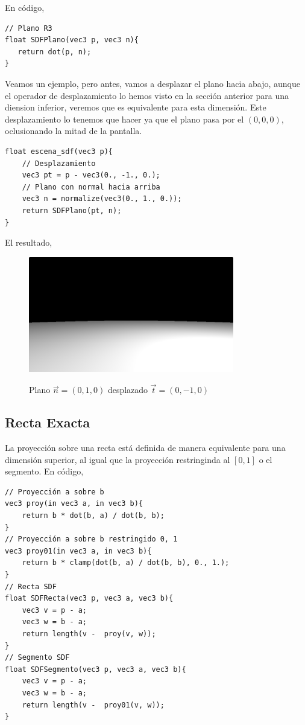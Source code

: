 En código,

\begin{lstlisting}
// Plano R3
float SDFPlano(vec3 p, vec3 n){
   return dot(p, n);
}
\end{lstlisting}

Veamos un ejemplo, pero antes, vamos a desplazar el plano hacia abajo, aunque el operador de desplazamiento lo hemos visto en la sección anterior para una diension inferior, veremos que es equivalente para esta dimensión. Este desplazamiento lo tenemos que hacer ya que el plano pasa por el \((0,0,0)\), oclusionando la mitad de la pantalla.

\begin{lstlisting}
float escena_sdf(vec3 p){
    // Desplazamiento
    vec3 pt = p - vec3(0., -1., 0.);
    // Plano con normal hacia arriba
    vec3 n = normalize(vec3(0., 1., 0.));
    return SDFPlano(pt, n);
}
\end{lstlisting}

El resultado,

\begin{figure}[H]
  \centering
  \captionsetup{justification=centering}%
  \includegraphics[width=0.8\textwidth]{secciones/imagenes/sdf/3d/sdf_plano.png}\label{fig:plano}
  \caption{Plano \(\Vec{n}=(0,1,0)\) desplazado \(\Vec{t}=(0, -1, 0)\)}
\end{figure}

\subsection{Recta Exacta}

La proyección sobre una recta está definida de manera equivalente para una dimensión superior, al igual que la proyección restringinda al \([0,1]\) o el segmento.
En código,
\begin{lstlisting}
// Proyección a sobre b
vec3 proy(in vec3 a, in vec3 b){
    return b * dot(b, a) / dot(b, b);
}
// Proyección a sobre b restringido 0, 1
vec3 proy01(in vec3 a, in vec3 b){
    return b * clamp(dot(b, a) / dot(b, b), 0., 1.);
}
// Recta SDF
float SDFRecta(vec3 p, vec3 a, vec3 b){
    vec3 v = p - a;
    vec3 w = b - a;
    return length(v -  proy(v, w));
}
// Segmento SDF
float SDFSegmento(vec3 p, vec3 a, vec3 b){
    vec3 v = p - a;
    vec3 w = b - a;
    return length(v -  proy01(v, w));
}
\end{lstlisting}

